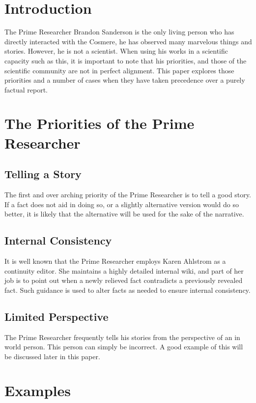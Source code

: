 \documentclass[conference]{IEEEtran}
\begin{document}
\section{Introduction}
The Prime Researcher Brandon Sanderson is the only living person who has directly interacted with the Cosmere, he has observed many marvelous things and stories.  However, he is not a scientist.\cite{not-science}  When using his works in a scientific capacity such as this, it is important to note that his priorities, and those of the scientific community are not in perfect alignment.  This paper explores those priorities and a number of cases when they have taken precedence over a purely factual report.

\section{The Priorities of the Prime Researcher}

\subsection{Telling a Story}
The first and over arching priority of the Prime Researcher is to tell a good story.  If a fact does not aid in doing so, or a slightly alternative version would do so better, it is likely that the alternative will be used for the sake of the narrative.
\subsection{Internal Consistency}

It is well known that the Prime Researcher employs Karen Ahlstrom as a continuity editor. \cite{consistency}\cite{karen}  She maintains a highly detailed internal wiki, and part of her job is to point out when a newly relieved fact contradicts a previously revealed fact.  Such guidance is used to alter facts as needed to ensure internal consistency.

\subsection{Limited Perspective}
The Prime Researcher frequently tells his stories from the perspective of an in world person.  This person can simply be incorrect.  A good example of this will be discussed later in this paper.


\section{Examples}
\end{document}
